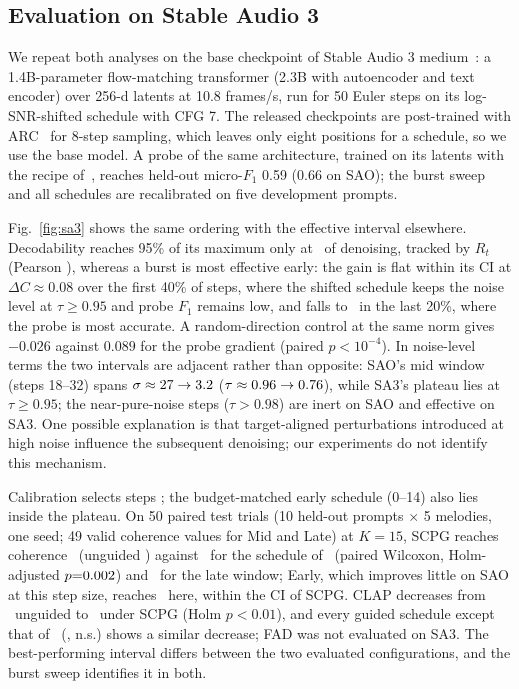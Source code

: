 \documentclass{article}
\begin{document}
\subsection{Evaluation on Stable Audio 3}
\label{sec:sa3}
We repeat both analyses on the base checkpoint of Stable Audio 3 medium~\cite{evans2026stableaudio3}: a 1.4B-parameter flow-matching transformer (2.3B with autoencoder and text encoder) over 256-d latents at 10.8 frames/s, run for 50 Euler steps on its log-SNR-shifted schedule with CFG 7. The released checkpoints are post-trained with ARC~\cite{novack2025arc} for 8-step sampling, which leaves only eight positions for a schedule, so we use the base model. A probe of the same architecture, trained on its latents with the recipe of~\cite{ye2026pitchclass}, reaches held-out micro-$F_1$ 0.59 (0.66 on SAO); the burst sweep and all schedules are recalibrated on five development prompts.

Fig.~\ref{fig:sa3} shows the same ordering with the effective interval elsewhere. Decodability reaches 95\% of its maximum only at \saThreePeakF\ of denoising, tracked by $R_t$ (Pearson \saThreeCorrRF), whereas a burst is most effective early: the gain is flat within its CI at $\Delta C\approx0.08$ over the first 40\% of steps, where the shifted schedule keeps the noise level at $\tau\ge0.95$ and probe $F_1$ remains low, and falls to \saThreeDClate\ in the last 20\%, where the probe is most accurate. A random-direction control at the same norm gives $-0.026$ against $0.089$ for the probe gradient (paired $p{<}10^{-4}$). In noise-level terms the two intervals are adjacent rather than opposite: SAO's mid window (steps 18--32) spans $\sigma\approx27\to3.2$ ($\tau\approx0.96\to0.76$), while SA3's plateau lies at $\tau\ge0.95$; the near-pure-noise steps ($\tau>0.98$) are inert on SAO and effective on SA3. One possible explanation is that target-aligned perturbations introduced at high noise influence the subsequent denoising; our experiments do not identify this mechanism.

Calibration selects steps \saThreeRAPGsteps; the budget-matched early schedule (0--14) also lies inside the plateau. On 50 paired test trials (10 held-out prompts $\times$ 5 melodies, one seed; 49 valid coherence values for Mid and Late) at $K{=}15$, SCPG reaches coherence \saThreeCohTopK\ (unguided \saThreeCohSAO) against \saThreeCohMLSP\ for the schedule of~\cite{ye2026pitchclass} (paired Wilcoxon, Holm-adjusted $p{=}0.002$) and \saThreeCohLate\ for the late window; Early, which improves little on SAO at this step size, reaches \saThreeCohEarly\ here, within the CI of SCPG. CLAP decreases from \saThreeClapSAO\ unguided to \saThreeClapTopK\ under SCPG (Holm $p{<}0.01$), and every guided schedule except that of~\cite{ye2026pitchclass} (\saThreeClapMLSP, n.s.) shows a similar decrease; FAD was not evaluated on SA3. The best-performing interval differs between the two evaluated configurations, and the burst sweep identifies it in both.
\end{document}
